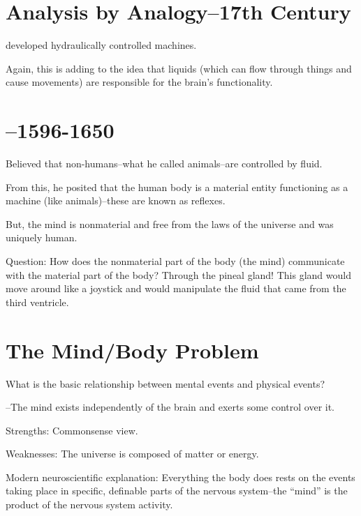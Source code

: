 \section{Analysis by Analogy--17th Century}

\begin{coloredlist}
    \item {} developed hydraulically controlled machines.
    \item Again, this is adding to the idea that liquids (which can flow through things and cause movements) are responsible for the brain's functionality.
\end{coloredlist}
\label{person:descartes}%
\section{--1596-1650}

\begin{coloredlist}
    \item Believed that non-humans--what he called animals--are controlled by fluid.
    \item From this, he posited that the human body is a material entity functioning as a machine (like animals)--these are known as reflexes.
    \item But, the mind is nonmaterial and free from the laws of the universe and was uniquely human.
    \item Question: How does the nonmaterial part of the body (the mind) communicate with the material part of the body? Through the pineal gland! This gland would move around like a joystick and would manipulate the fluid that came from the third ventricle.
\end{coloredlist}

\section{The Mind/Body Problem}

\begin{coloredlist}
    \item What is the basic relationship between mental events and physical events?
    \item {}--The mind exists independently of the brain and exerts some control over it.
    \item Strengths: Commonsense view.
    \item Weaknesses: The universe is composed of matter or energy.
    \item Modern neuroscientific explanation: Everything the body does rests on the events taking place in specific, definable parts of the nervous system--the ``mind'' is the product of the nervous system activity.
\end{coloredlist}

